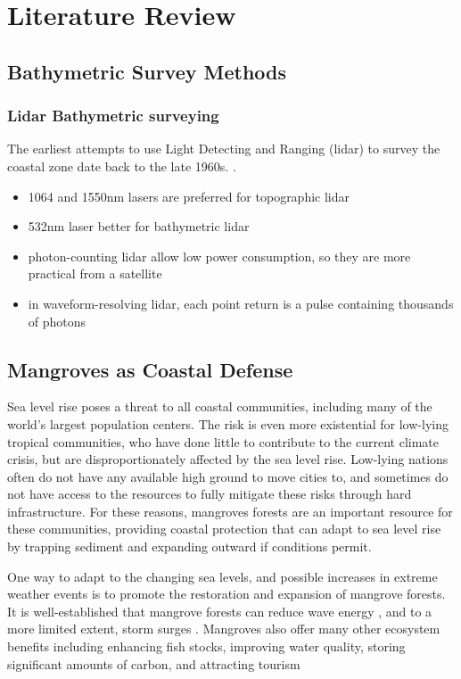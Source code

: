 \chapter{Literature Review}

\section{Bathymetric Survey Methods}

\subsection{Lidar Bathymetric surveying}

The earliest attempts to use Light Detecting and Ranging (lidar) to survey the coastal zone date back to the late 1960s. \parencite{Bailly2016}.

\begin{itemize}
      \item 1064 and 1550nm lasers are preferred for topographic lidar
      \item 532nm laser better for bathymetric lidar
      \item photon-counting lidar allow low power consumption, so they are more practical from a satellite
      \item in waveform-resolving lidar, each point return is a pulse containing thousands of photons
\end{itemize}

\section{Mangroves as Coastal Defense}

Sea level rise poses a threat to all coastal communities, including many of the world's largest population centers. The risk is even more existential for low-lying tropical communities, who have done little to contribute to the current climate crisis, but are disproportionately affected by the sea level rise. Low-lying nations often do not have any available high ground to move cities to, and sometimes do not have access to the resources to fully mitigate these risks through hard infrastructure. For these reasons, mangroves forests are an important resource for these communities, providing coastal protection that can adapt to sea level rise by trapping sediment and expanding outward if conditions permit.

One way to adapt to the changing sea levels, and possible increases in extreme weather events is to promote the restoration and expansion of mangrove forests. It is well-established that mangrove forests can reduce wave energy \parencite{Maza2019,Menendez2020,Hadi2003}, and to a more limited extent, storm surges \parencite{Montgomery2019a,Chen2021,Mcivor2012}. Mangroves also offer many other ecosystem benefits including enhancing fish stocks, improving water quality, storing significant amounts of carbon, and attracting tourism \parencite{Atkinson2016b}

